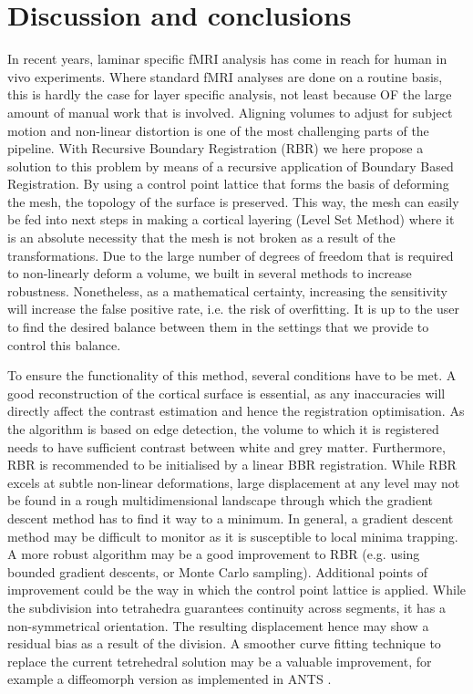 \section{Discussion and conclusions}
In recent years, laminar specific fMRI analysis has come in reach for human in vivo experiments. Where standard fMRI analyses are done on a routine basis, this is hardly the case for layer specific analysis, not least because OF the large amount of manual work that is involved. Aligning volumes to adjust for subject motion and non-linear distortion is one of the most challenging parts of the pipeline. With Recursive Boundary Registration (RBR) we here propose a solution to this problem by means of a recursive application of Boundary Based Registration. By using a control point lattice that forms the basis of deforming the mesh, the topology of the surface is preserved. This way, the mesh can easily be fed into next steps in making a cortical layering (Level Set Method) where it is an absolute necessity that the mesh is not broken as a result of the transformations. Due to the large number of degrees of freedom that is required to non-linearly deform a volume, we built in several methods to increase robustness. Nonetheless, as a mathematical certainty, increasing the sensitivity will increase the false positive rate, i.e. the risk of overfitting. It is up to the user to find the desired balance between them in the settings that we provide to control this balance. 

To ensure the functionality of this method, several conditions have to be met. A good reconstruction of the cortical surface is essential, as any inaccuracies will directly affect the contrast estimation and hence the registration optimisation. As the algorithm is based on edge detection, the volume to which it is registered needs to have sufficient contrast between white and grey matter. Furthermore, RBR is recommended to be initialised by a linear BBR registration. While RBR excels at subtle non-linear deformations, large displacement at any level may not be found in a rough multidimensional landscape through which the gradient descent method has to find it way to a minimum. In general, a gradient descent method may be difficult to monitor as it is susceptible to local minima trapping. A more robust algorithm may be a good improvement to RBR (e.g. using bounded gradient descents, or Monte Carlo sampling). Additional points of improvement could be the way in which the control point lattice is applied. While the subdivision into tetrahedra guarantees continuity across segments, it has a non-symmetrical orientation. The resulting displacement hence may show a residual bias as a result of the division. A smoother curve fitting technique to replace the current tetrehedral solution may be a valuable improvement, for example a diffeomorph version as implemented in ANTS \cite{Avants2011}. 


